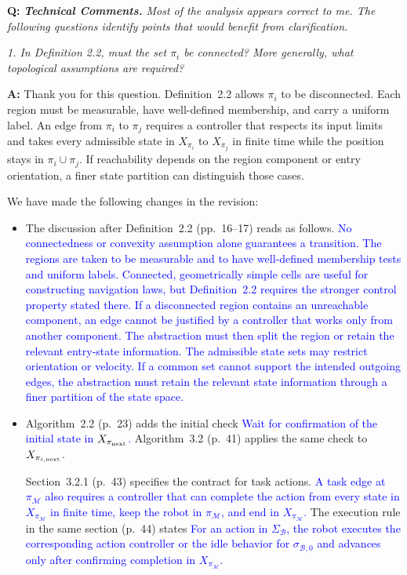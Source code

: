 \documentclass[11pt]{article}
\newcommand{\change}[1]{\textcolor{blue}{#1}}
\begin{document}
\begin{shaded*}
\noindent\textbf{Q:} \emph{\textbf{Technical Comments.} Most of the
analysis appears correct to me. The following questions identify points that would benefit
from clarification.}

\noindent\emph{1. In Definition 2.2, must the set $\pi_i$ be
connected? More generally, what topological assumptions are required?}
\end{shaded*}
\noindent\textbf{A:} Thank you for this question. Definition~2.2 allows $\pi_i$ to be
disconnected. Each region
must be measurable, have well-defined membership, and carry a uniform label.
An edge from $\pi_i$ to $\pi_j$ requires a controller that respects its input limits
and takes every admissible state in $X_{\pi_i}$ to $X_{\pi_j}$ in finite time while
the position stays in $\pi_i\cup\pi_j$. If reachability depends on the region
component or entry orientation, a finer state partition can distinguish those cases.

We have made the following changes in the revision:
\begin{itemize}
\item The discussion after Definition~2.2 (pp.~16--17) reads as follows.
\change{No connectedness or convexity assumption alone guarantees a transition.
The regions are taken to be measurable and to have well-defined membership
tests and uniform labels. Connected, geometrically simple cells are useful
for constructing navigation laws, but Definition~2.2
requires the stronger control property stated there. If a disconnected
region contains an unreachable component, an edge cannot be justified by a
controller that works only from another component. The abstraction must
then split the region or retain the relevant entry-state information.
The admissible state sets may restrict orientation or velocity. If a common
set cannot support the intended outgoing edges, the abstraction must retain
the relevant state information through a finer partition of the state space.}

\item Algorithm~2.2 (p.~23) adds the initial check
\change{Wait for confirmation of the initial state in $X_{\pi_{\textup{next}}}$.}
Algorithm~3.2 (p.~41) applies the same check to $X_{\pi_{i,\textup{next}}}$.

Section~3.2.1 (p.~43) specifies the contract for task actions.
\change{A task edge at $\pi_{\mathcal{M}}$ also requires a controller that can complete
the action from every state in $X_{\pi_{\mathcal{M}}}$ in finite time, keep the
robot in $\pi_{\mathcal{M}}$, and end in $X_{\pi_{\mathcal{M}}}$.}
The execution rule in the same section (p.~44) states
\change{For an action in $\Sigma_{\mathcal{B}}$, the robot executes the corresponding
action controller or the idle behavior for $\sigma_{\mathcal{B},0}$ and advances only
after confirming completion in $X_{\pi_{\mathcal{M}}}$.}
\end{itemize}
\end{document}

